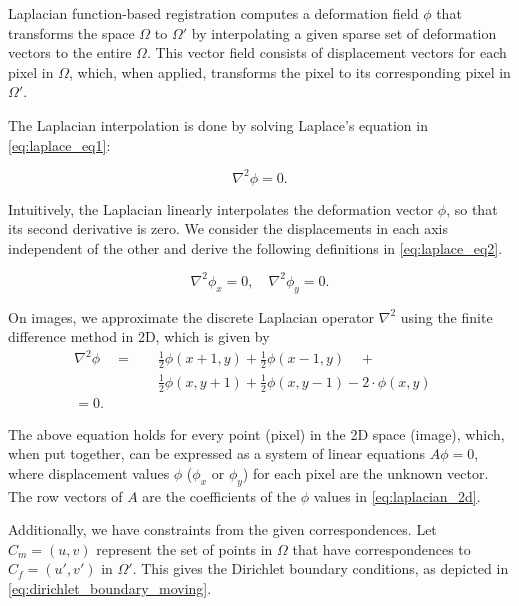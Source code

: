 Laplacian function-based registration \cite{RegBoost2025} computes a deformation field $\phi$ that transforms the space $\Omega$ to $\Omega'$ by interpolating a given sparse set of deformation vectors to the entire $\Omega$. This vector field consists of displacement vectors for each pixel in $\Omega$, which, when applied, transforms the pixel to its corresponding pixel in $\Omega'$. 

The Laplacian interpolation is done by solving Laplace's equation in \autoref{eq:laplace_eq1}:

\begin{equation} \label{eq:laplace_eq1}
\nabla^2 \phi = 0.
\end{equation}

Intuitively, the Laplacian linearly interpolates the deformation vector $\phi$, so that its second derivative is zero. We consider the displacements in each axis independent of the other and derive the following definitions in \autoref{eq:laplace_eq2}. 

\begin{equation} \label{eq:laplace_eq2}
\nabla^2 \phi_x = 0, \quad \nabla^2 \phi_y = 0.
\end{equation}

On images, we approximate the discrete Laplacian operator $\nabla^2$ using the finite difference method in 2D, which is given by 
\begin{equation} 
    \begin{split} \label{eq:laplacian_2d}
    \nabla^2 \phi \quad = \quad & \frac{1}{2}\phi(x + 1, y)+ \frac{1}{2} \phi(x - 1, y)\quad+\\ 
    & \frac{1}{2}\phi(x, y + 1) + \frac{1}{2}\phi(x, y - 1) - 2\cdot\phi(x, y) \quad \\
    = 0.
    \end{split} 
\end{equation}

The above equation holds for every point (pixel) in the 2D space (image), which, when put together, can be expressed as a system of linear equations $A\phi=0$, where displacement values $\phi$ ($\phi_x$ or $\phi_y$) for each pixel are the unknown vector. The row vectors of $A$ are the coefficients of the $\phi$ values in \autoref{eq:laplacian_2d}. 

Additionally, we have constraints from the given correspondences. Let $C_m = (u, v)$ represent the set of points in $\Omega$ that have correspondences to $C_f = (u', v')$ in $\Omega'$. This gives the Dirichlet boundary conditions, as depicted in \autoref{eq:dirichlet_boundary_moving}.

